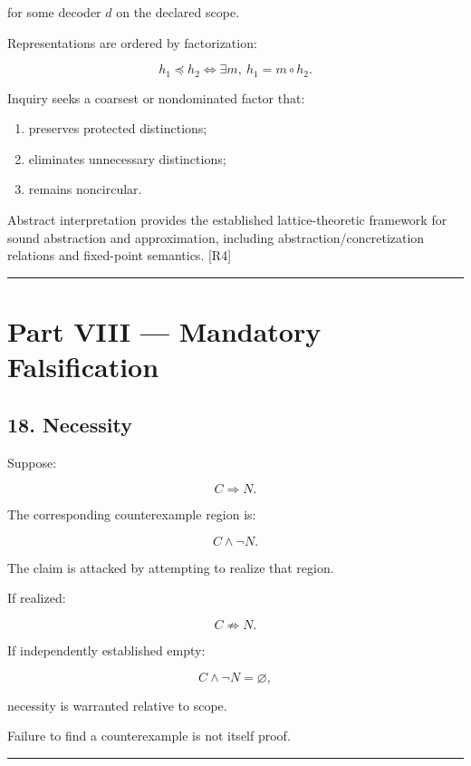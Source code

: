 \documentclass[
]{article}
\providecommand{\tightlist}{%
  \setlength{\itemsep}{0pt}\setlength{\parskip}{0pt}}
\begin{document}
for some decoder \(d\) on the declared scope.

Representations are ordered by factorization:

\[
\boxed{
h_1\preceq h_2
\iff
\exists m,\ h_1=m\circ h_2.
}
\]

Inquiry seeks a coarsest or nondominated factor that:

\begin{enumerate}
\def\labelenumi{\arabic{enumi}.}
\tightlist
\item
  preserves protected distinctions;
\item
  eliminates unnecessary distinctions;
\item
  remains noncircular.
\end{enumerate}

Abstract interpretation provides the established lattice-theoretic
framework for sound abstraction and approximation, including
abstraction/concretization relations and fixed-point semantics. {[}R4{]}

\begin{center}\rule{0.5\linewidth}{0.5pt}\end{center}

\section{Part VIII --- Mandatory
Falsification}\label{part-viii-mandatory-falsification}

\subsection{18. Necessity}\label{necessity}

Suppose:

\[
C\Rightarrow N.
\]

The corresponding counterexample region is:

\[
\boxed{
C\land\neg N.
}
\]

The claim is attacked by attempting to realize that region.

If realized:

\[
C\not\Rightarrow N.
\]

If independently established empty:

\[
C\land\neg N=\varnothing,
\]

necessity is warranted relative to scope.

Failure to find a counterexample is not itself proof.

\begin{center}\rule{0.5\linewidth}{0.5pt}\end{center}
\end{document}
